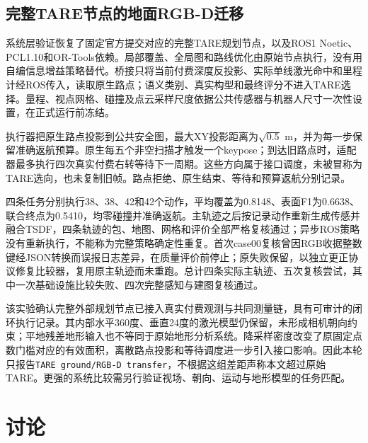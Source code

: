 \documentclass[11pt,a4paper]{article}
\begin{document}
\subsection{完整TARE节点的地面RGB-D迁移}
系统层验证恢复了固定官方提交对应的完整TARE规划节点，以及ROS1 Noetic、PCL1.10和OR-Tools依赖。局部覆盖、全局图和路线优化由原始节点执行，没有用自编信息增益策略替代。桥接只将当前付费深度反投影、实际单线激光命中和里程计经ROS传入，读取原生路点；语义类别、真实构型和最终评分不进入TARE选择。量程、视点网格、碰撞及点云采样尺度依据公共传感器与机器人尺寸一次性设置，在正式运行前冻结。

执行器把原生路点投影到公共安全图，最大XY投影距离为$\sqrt{0.5}$ m，并为每一步保留准确返航预算。原生每五个非空扫描才触发一个keypose；到达旧路点时，适配器最多执行四次真实付费右转等待下一周期。这些方向属于接口调度，未被冒称为TARE选向，也未复制旧帧。路点拒绝、原生结束、等待和预算返航分别记录。

\begin{table}[htbp]
\centering\small
\caption{完整TARE节点迁移的四条实际轨迹。$N_{\rm native}$为执行原生目标的动作，$N_{\rm wait}$与$N_{\rm return}$为适配器等待和保护返航动作；加上共同前缀18步等于总动作数。全部任务满足覆盖、安全与返航资格。该表不与共同CPU机制表混作完整方法性能排名。}
\label{tab:tare_transfer}
\begingroup\setlength{\tabcolsep}{4pt}

\endgroup
\end{table}

四条任务分别执行38、38、42和42个动作，平均覆盖为0.8148、表面F1为0.6638、联合终点为0.5410，均零碰撞并准确返航。主轨迹之后按记录动作重新生成传感并融合TSDF，四条轨迹的包、地图、网格和评价全部严格复核通过；异步ROS策略没有重新执行，不能称为完整策略确定性重复。首次case00复核曾因RGB收据整数键经JSON转换而误报日志差异，在质量评价前停止；原失败保留，以独立更正协议修复比较器，复用原主轨迹而未重跑。总计四条实际主轨迹、五次复核尝试，其中一次基础设施比较失败、四次完整感知与建图复核通过。

该实验确认完整外部规划节点已接入真实付费观测与共同测量链，具有可审计的闭环执行记录。其内部水平360度、垂直24度的激光模型仍保留，未形成相机朝向约束；平地残差地形输入也不等同于原始地形分析系统。降采样密度改变了原固定点数门槛对应的有效面积，离散路点投影和等待调度进一步引入接口影响。因此本轮只报告\texttt{TARE ground/RGB-D transfer}，不根据这组差距声称本文超过原始TARE。更强的系统比较需另行验证视场、朝向、运动与地形模型的任务匹配。




\section{讨论}
\end{document}
